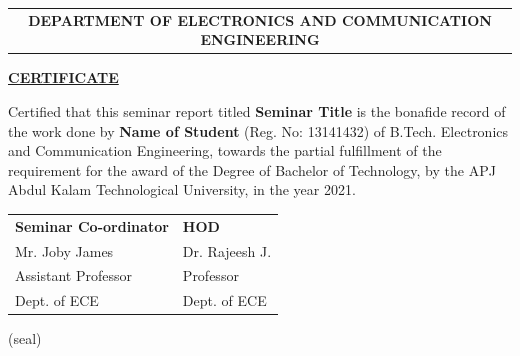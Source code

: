 \vspace{0.2cm}
\begin{table}[h]
\begin{tabular}{c}
\textbf{DEPARTMENT OF ELECTRONICS AND COMMUNICATION ENGINEERING}
\end{tabular}
\end{table}
\vspace{0.5cm}
\begin{center}
	{\underline{\Large \textbf{CERTIFICATE}}}\\[1cm]
	
\end{center}

\normalsize Certified that this seminar report titled \textbf{Seminar Title} is the bonafide record of the work done by \textbf{Name of Student} (Reg. No: 13141432) of B.Tech. Electronics and Communication Engineering, towards the partial fulfillment of the requirement for the award of the Degree of Bachelor of Technology, by the APJ Abdul Kalam Technological University, in the year 2021.\\

\vspace{2cm}
\begin{table}[h]
\centering
\begin{tabular}{l l}
\textbf{Seminar Co-ordinator} & \textbf{HOD} \\ 

Mr. Joby James \hspace{8cm} & Dr. Rajeesh J. \\ 
Assistant Professor  & Professor \\
Dept. of ECE & Dept. of ECE \\
\end{tabular}
\end{table}

\vspace{3cm}

\begin{flushleft}
\hspace{8cm}(seal) \\
\end{flushleft}







